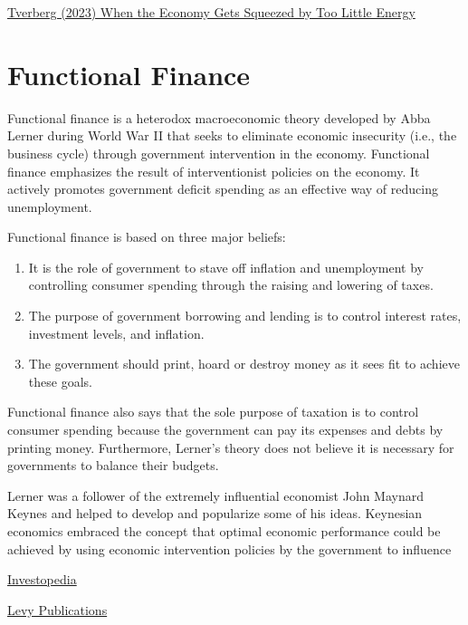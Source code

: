 \documentclass[
]{book}
\providecommand{\tightlist}{%
  \setlength{\itemsep}{0pt}\setlength{\parskip}{0pt}}
\begin{document}
\href{https://ourfiniteworld.com/2023/03/05/when-the-economy-gets-squeezed-by-too-little-energy/}{Tverberg (2023) When the Economy Gets Squeezed by Too Little Energy}

\hypertarget{functional-finance}{%
\chapter{Functional Finance}\label{functional-finance}}

Functional finance is a heterodox macroeconomic theory developed by Abba Lerner during World War II that seeks to eliminate economic insecurity (i.e., the business cycle) through government intervention in the economy. Functional finance emphasizes the result of interventionist policies on the economy. It actively promotes government deficit spending as an effective way of reducing unemployment.

Functional finance is based on three major beliefs:

\begin{enumerate}
\def\labelenumi{\arabic{enumi}.}
\tightlist
\item
  It is the role of government to stave off inflation and unemployment by controlling consumer spending through the raising and lowering of taxes.
\item
  The purpose of government borrowing and lending is to control interest rates, investment levels, and inflation.
\item
  The government should print, hoard or destroy money as it sees fit to achieve these goals.
\end{enumerate}

Functional finance also says that the sole purpose of taxation is to control consumer spending because the government can pay its expenses and debts by printing money. Furthermore, Lerner's theory does not believe it is necessary for governments to balance their budgets.

Lerner was a follower of the extremely influential economist John Maynard Keynes and helped to develop and popularize some of his ideas. Keynesian economics embraced the concept that optimal economic performance could be achieved by using economic intervention policies by the government to influence

\href{https://www.investopedia.com/terms/f/functional-finance.asp}{Investopedia}

\href{http://www.levyinstitute.org/topics/functional-finance}{Levy Publications}
\end{document}
